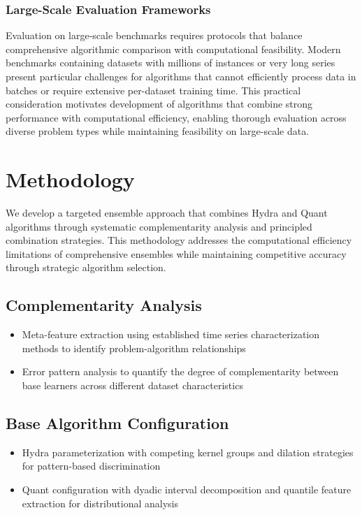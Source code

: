 \documentclass[pdflatex,sn-basic]{sn-jnl}           %
\theoremstyle{thmstyleone}%
\theoremstyle{thmstyletwo}%
\theoremstyle{thmstylethree}%
\begin{document}
\subsubsection{Large-Scale Evaluation Frameworks}

Evaluation on large-scale benchmarks requires protocols that balance comprehensive algorithmic comparison with computational feasibility. Modern benchmarks containing datasets with millions of instances or very long series present particular challenges for algorithms that cannot efficiently process data in batches or require extensive per-dataset training time. This practical consideration motivates development of algorithms that combine strong performance with computational efficiency, enabling thorough evaluation across diverse problem types while maintaining feasibility on large-scale data.

\section{Methodology}\label{sec3}

We develop a targeted ensemble approach that combines Hydra and Quant algorithms through systematic complementarity analysis and principled combination strategies. This methodology addresses the computational efficiency limitations of comprehensive ensembles while maintaining competitive accuracy through strategic algorithm selection.

\subsection{Complementarity Analysis}
\begin{itemize}
\item Meta-feature extraction using established time series characterization methods to identify problem-algorithm relationships
\item Error pattern analysis to quantify the degree of complementarity between base learners across different dataset characteristics
\end{itemize}

\subsection{Base Algorithm Configuration}
\begin{itemize}
\item Hydra parameterization with competing kernel groups and dilation strategies for pattern-based discrimination
\item Quant configuration with dyadic interval decomposition and quantile feature extraction for distributional analysis
\end{itemize}
\end{document}
